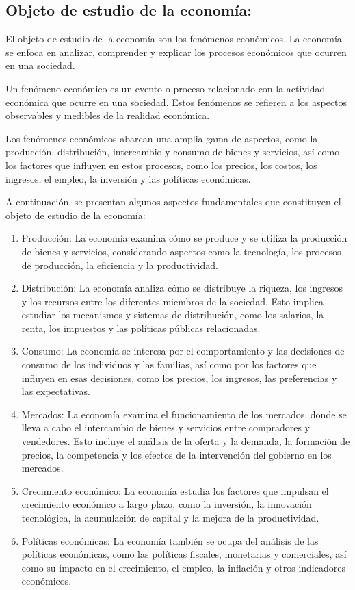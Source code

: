 \documentclass[
  jou,
  floatsintext,
  longtable,
  a4paper,
  nolmodern,
  notxfonts,
  notimes,
  12pt,
  colorlinks=true,linkcolor=blue,citecolor=blue,urlcolor=blue]{apa7}
\begin{document}
\subsection{Objeto de estudio de la
economía:}\label{objeto-de-estudio-de-la-economuxeda}

El objeto de estudio de la economía son los fenómenos económicos. La
economía se enfoca en analizar, comprender y explicar los procesos
económicos que ocurren en una sociedad.

Un fenómeno económico es un evento o proceso relacionado con la
actividad económica que ocurre en una sociedad. Estos fenómenos se
refieren a los aspectos observables y medibles de la realidad económica.

Los fenómenos económicos abarcan una amplia gama de aspectos, como la
producción, distribución, intercambio y consumo de bienes y servicios,
así como los factores que influyen en estos procesos, como los precios,
los costos, los ingresos, el empleo, la inversión y las políticas
económicas.

A continuación, se presentan algunos aspectos fundamentales que
constituyen el objeto de estudio de la economía:

\begin{enumerate}
\def\labelenumi{\arabic{enumi}.}
\item
  Producción: La economía examina cómo se produce y se utiliza la
  producción de bienes y servicios, considerando aspectos como la
  tecnología, los procesos de producción, la eficiencia y la
  productividad.
\item
  Distribución: La economía analiza cómo se distribuye la riqueza, los
  ingresos y los recursos entre los diferentes miembros de la sociedad.
  Esto implica estudiar los mecanismos y sistemas de distribución, como
  los salarios, la renta, los impuestos y las políticas públicas
  relacionadas.
\item
  Consumo: La economía se interesa por el comportamiento y las
  decisiones de consumo de los individuos y las familias, así como por
  los factores que influyen en esas decisiones, como los precios, los
  ingresos, las preferencias y las expectativas.
\item
  Mercados: La economía examina el funcionamiento de los mercados, donde
  se lleva a cabo el intercambio de bienes y servicios entre compradores
  y vendedores. Esto incluye el análisis de la oferta y la demanda, la
  formación de precios, la competencia y los efectos de la intervención
  del gobierno en los mercados.
\item
  Crecimiento económico: La economía estudia los factores que impulsan
  el crecimiento económico a largo plazo, como la inversión, la
  innovación tecnológica, la acumulación de capital y la mejora de la
  productividad.
\item
  Políticas económicas: La economía también se ocupa del análisis de las
  políticas económicas, como las políticas fiscales, monetarias y
  comerciales, así como su impacto en el crecimiento, el empleo, la
  inflación y otros indicadores económicos.
\end{enumerate}
\end{document}
